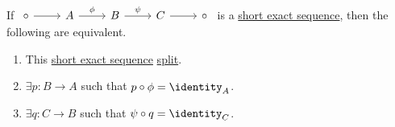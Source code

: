 \begin{lemma}\label{lma:splitting-lemma}
	If \(\begin{tikzcd}
		\circ & A & B & C & \circ
		\arrow["\phi ", from=1-2, to=1-3]
		\arrow["\psi", from=1-3, to=1-4]
		\arrow[from=1-1, to=1-2]
		\arrow[from=1-4, to=1-5]
	\end{tikzcd}\) is a \hyperref[def:short-exact-sequence]{short exact sequence}, then the following are equivalent.
	\begin{enumerate}
		\item This \hyperref[def:short-exact-sequence]{short exact sequence} \hyperref[def:split-short-exact-sequence]{split}.
		\item \(\exists p\colon B\to A\) such that \(p\circ \phi = \identity_{A} \).
		\item \(\exists q\colon C\to B\) such that \(\psi \circ q = \identity_{C}\).
	\end{enumerate}
\end{lemma}

